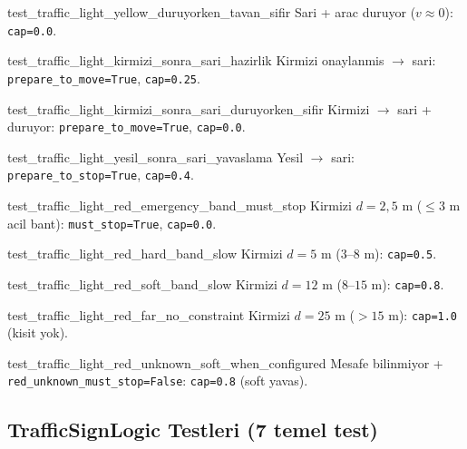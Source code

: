 \documentclass[a4paper,12pt]{article}
\begin{document}
\begin{testbox}{test\_traffic\_light\_yellow\_duruyorken\_tavan\_sifir}
Sari + arac duruyor ($v \approx 0$): \texttt{cap=0.0}.
\end{testbox}

\begin{testbox}{test\_traffic\_light\_kirmizi\_sonra\_sari\_hazirlik}
Kirmizi onaylanmis $\to$ sari: \texttt{prepare\_to\_move=True},
\texttt{cap=0.25}.
\end{testbox}

\begin{testbox}{test\_traffic\_light\_kirmizi\_sonra\_sari\_duruyorken\_sifir}
Kirmizi $\to$ sari + duruyor: \texttt{prepare\_to\_move=True},
\texttt{cap=0.0}.
\end{testbox}

\begin{testbox}{test\_traffic\_light\_yesil\_sonra\_sari\_yavaslama}
Yesil $\to$ sari: \texttt{prepare\_to\_stop=True}, \texttt{cap=0.4}.
\end{testbox}

\begin{testbox}{test\_traffic\_light\_red\_emergency\_band\_must\_stop}
Kirmizi $d=2{,}5$ m ($\leq 3$ m acil bant):
\texttt{must\_stop=True}, \texttt{cap=0.0}.
\end{testbox}

\begin{testbox}{test\_traffic\_light\_red\_hard\_band\_slow}
Kirmizi $d=5$ m ($3$--$8$ m): \texttt{cap=0.5}.
\end{testbox}

\begin{testbox}{test\_traffic\_light\_red\_soft\_band\_slow}
Kirmizi $d=12$ m ($8$--$15$ m): \texttt{cap=0.8}.
\end{testbox}

\begin{testbox}{test\_traffic\_light\_red\_far\_no\_constraint}
Kirmizi $d=25$ m ($> 15$ m): \texttt{cap=1.0} (kisit yok).
\end{testbox}

\begin{testbox}{test\_traffic\_light\_red\_unknown\_soft\_when\_configured}
Mesafe bilinmiyor + \texttt{red\_unknown\_must\_stop=False}:
\texttt{cap=0.8} (soft yavas).
\end{testbox}

\subsection{TrafficSignLogic Testleri (7 temel test)}
\end{document}
